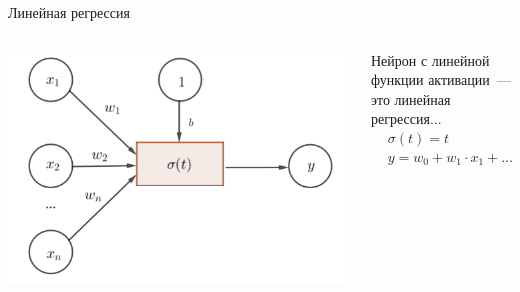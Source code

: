 \documentclass[notes,12pt, aspectratio=169]{beamer}
\begin{document}
\begin{frame}{Линейная регрессия}
\begin{columns}[T]
	\begin{column}{.45\textwidth}
		\begin{center}
			\includegraphics[width=0.99\linewidth]{neuron_3.png}
		\end{center}
	\end{column}%
	\hfill%
	\begin{column}{.55\textwidth}
		Нейрон с линейной функции активации~—   это линейная регрессия...
		\begin{equation*}
		\begin{aligned}
		& \sigma(t) = t \\
		& y= w_0 + w_1 \cdot x_1 + \ldots + w_n \cdot x_n \\
		\end{aligned}
		\end{equation*}
	\end{column}%
\end{columns}
\end{frame}
\end{document}
